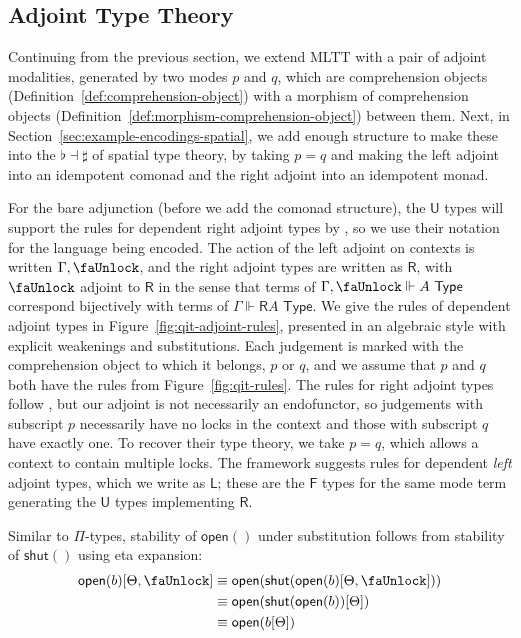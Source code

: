 \documentclass[10pt]{article}
\theoremstyle{definition}
\newcommand{\TYPE}{\,\,\mathsf{Type}}
\newcommand{\qyields}{\Vdash}
\newcommand{\lock}{\text{\faUnlock}}
\newcommand{\Rtype}[1]{\mathsf{R}{#1}}
\newcommand{\RI}[1]{\mathsf{shut}({#1})}
\newcommand{\RE}[1]{\mathsf{open}({#1})}
\newcommand{\Ltype}[1]{\mathsf{L}{#1}}
\begin{document}
\subsection{Adjoint Type Theory}

Continuing from the previous section, we extend MLTT with a pair of
adjoint modalities, generated by two modes $p$ and $q$, which are
comprehension objects (Definition~\ref{def:comprehension-object}) with a
morphism of comprehension objects
(Definition~\ref{def:morphism-comprehension-object}) between them.
Next, in Section~\ref{sec:example-encodings-spatial}, we add enough
structure to make these into the $\flat \dashv \sharp$ of spatial type
theory, by taking $p = q$ and making the left adjoint into an idempotent
comonad and the right adjoint into an idempotent monad.

For the bare adjunction (before we add the comonad structure), the
$\mathsf{U}$ types will support the rules for dependent right adjoint
types by \citet{birkedal+18rightadjoint}, so we use their notation for
the language being encoded.  The action of the left adjoint on contexts
is written $\Gamma,\lock$, and the right adjoint types are written as
$\Rtype{}$, with $\lock$ adjoint to $\Rtype{}$ in the sense that terms
of $\Gamma, \lock \qyields A \TYPE$ correspond bijectively with terms of
$\Gamma \qyields \Rtype{A} \TYPE$.  We give the rules of dependent
adjoint types in Figure~\ref{fig:qit-adjoint-rules}, presented in an
algebraic style with explicit weakenings and substitutions.  Each
judgement is marked with the comprehension object to which it belongs,
$p$ or $q$, and we assume that $p$ and $q$ both have the rules from
Figure~\ref{fig:qit-rules}.  The rules for right adjoint types follow
\citet{birkedal+18rightadjoint}, but our adjoint is not necessarily an
endofunctor, so judgements with subscript $p$ necessarily have no locks
in the context and those with subscript $q$ have exactly one.  To
recover their type theory, we take $p = q$, which allows a context to
contain multiple locks.  The framework suggests rules for dependent
\emph{left} adjoint types, which we write as $\Ltype{}$; these are the
$\mathsf{F}$ types for the same mode term generating the $\mathsf{U}$
types implementing $\mathsf{R}$.

Similar to $\Pi$-types, stability of $\RE{}$ under substitution follows from stability of $\RI{}$ using eta expansion:
\begin{align*}
\RE{b}[\Theta, \lock] 
&\equiv \RE{\RI{\RE{b}[\Theta, \lock]}} \\
&\equiv \RE{\RI{\RE{b}}[\Theta]} \\
&\equiv \RE{b[\Theta]}
\end{align*}
\end{document}
